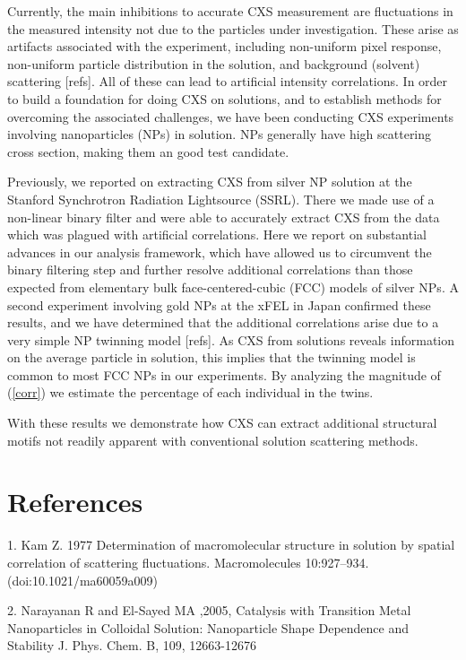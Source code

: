\documentclass [11pt,fleqn]{article}
\begin{document}
Currently, the main inhibitions to accurate CXS measurement are fluctuations in the measured intensity not due to the particles under investigation. These arise as artifacts associated with the experiment, including non-uniform pixel response, non-uniform particle distribution in the solution, and background (solvent) scattering [refs]. All of these can lead to artificial intensity correlations. In order to build a foundation for doing CXS on solutions, and to establish methods for overcoming the associated challenges, we have been conducting CXS experiments involving nanoparticles (NPs) in solution. NPs generally have high scattering cross section, making them an good test candidate.

Previously, we reported on extracting CXS from silver NP solution at the Stanford Synchrotron Radiation Lightsource (SSRL). There we made use of a non-linear binary filter and were able to accurately extract CXS from the data which was plagued with artificial correlations. Here we report on substantial advances in our analysis framework, which have allowed us to circumvent the binary filtering step and further resolve additional correlations than those expected from elementary bulk face-centered-cubic (FCC) models of silver NPs. A second experiment involving gold NPs at the xFEL in Japan  confirmed these results, and we have determined that the additional correlations arise due to a very simple NP twinning model [refs]. As CXS from solutions reveals information on the average particle in solution, this implies that the twinning model is common to most FCC NPs in our experiments. By analyzing the magnitude of (\ref{corr}) we estimate the percentage of each individual in the twins.

With these results we demonstrate how CXS can extract additional structural motifs not readily apparent with conventional solution scattering methods.
 


\section{References}

1. Kam Z. 1977 Determination of macromolecular structure in solution by spatial correlation of scattering fluctuations. Macromolecules 10:927–934. (doi:10.1021/ma60059a009)

2. Narayanan R and El-Sayed MA ,2005, Catalysis with Transition Metal Nanoparticles in Colloidal Solution: Nanoparticle Shape Dependence and Stability J. Phys. Chem. B, 109, 12663-12676
\end{document}
